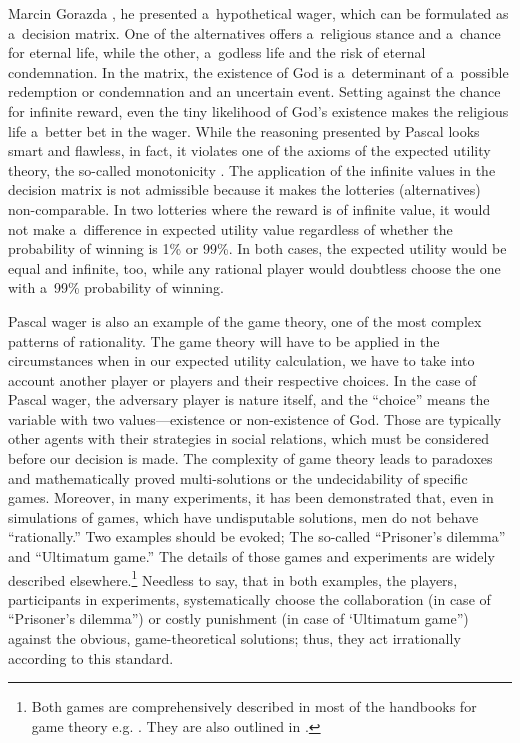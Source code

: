 \begin{artengenv}{Marcin Gorazda}
\parencite[][]{pascal_pensees_2003}, %
 he presented a~hypothetical wager, which can be formulated as a~decision matrix. One of the alternatives offers a~religious stance and a~chance for eternal life, while the other, a~godless life and the risk of eternal condemnation. In the matrix, the existence of God is a~determinant of a~possible redemption or condemnation and an uncertain event. Setting against the chance for infinite reward, even the tiny likelihood of God's existence makes the religious life a~better bet in the wager. While the reasoning presented by Pascal looks smart and flawless, in fact, it violates one of the axioms of the expected utility theory, the so-called monotonicity 
\parencites[][]{jordan_pascals_2006}[][]{gorazda_pragmatyzm_2009}. %
 The application of the infinite values in the decision matrix is not admissible because it makes the lotteries (alternatives) non-comparable. In two lotteries where the reward is of infinite value, it would not make a~difference in expected utility value regardless of whether the probability of winning is 1\% or 99\%. In both cases, the expected utility would be equal and infinite, too, while any rational player would doubtless choose the one with a~99\% probability of winning.

Pascal wager is also an example of the game theory, one of the most complex patterns of rationality. The game theory will have to be applied in the circumstances when in our expected utility calculation, we have to take into account another player or players and their respective choices. In the case of Pascal wager, the adversary player is nature itself, and the ``choice'' means the variable with two values---existence or non-existence of God. Those are typically other agents with their strategies in social relations, which must be considered before our decision is made. The complexity of game theory leads to paradoxes and mathematically proved multi-solutions or the undecidability of specific games. Moreover, in many experiments, it has been demonstrated that, even in simulations of games, which have undisputable solutions, men do not behave ``rationally.'' Two examples should be evoked; The so-called ``Prisoner's dilemma'' and ``Ultimatum game.'' The details of those games and experiments are widely described elsewhere.\footnote{Both games are comprehensively described in most of the handbooks for game theory e.g.
\parencites[][]{straffin_game_2002}[][]{straffin_teoria_2004}. %
 They are also outlined in 
\parencite[][]{hausman_economic_2006}. %
 } Needless to say, that in both examples, the players, participants in experiments, systematically choose the collaboration (in case of ``Prisoner's dilemma'') or costly punishment (in case of ‘Ultimatum game'') against the obvious, game-theoretical solutions; thus, they act irrationally according to this standard.


\end{artengenv}
